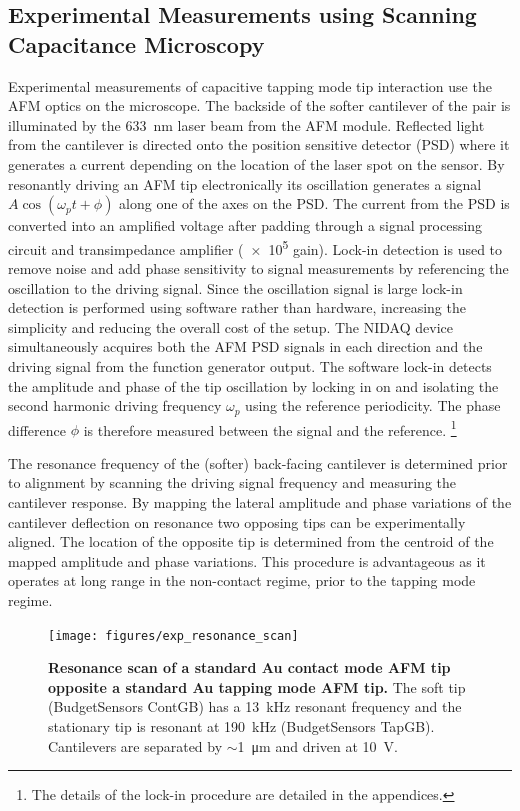 \documentclass{article}
\begin{document}
\FloatBarrier
\subsection{Experimental Measurements using Scanning Capacitance Microscopy}

Experimental measurements of capacitive tapping mode tip interaction use the AFM optics on the microscope. The backside of the softer cantilever of the pair is illuminated by the \SI{633}{nm} laser beam from the AFM module. Reflected light from the cantilever is directed onto the position sensitive detector (PSD) where it generates a current depending on the location of the laser spot on the sensor.
By resonantly driving an AFM tip electronically its oscillation generates a signal $A\cos(\omega_p t + \phi)$ along one of the axes on the PSD. The current from the PSD is converted into an amplified voltage after padding through a signal processing circuit and transimpedance amplifier (\num{e5} gain). Lock-in detection is used to remove noise and add phase sensitivity to signal measurements by referencing the oscillation to the driving signal. Since the oscillation signal is large lock-in detection is performed using software rather than hardware, increasing the simplicity and reducing the overall cost of the setup. The NIDAQ device simultaneously acquires both the AFM PSD signals in each direction and the driving signal from the function generator output. The software lock-in detects the amplitude and phase of the tip oscillation by locking in on and isolating the second harmonic driving frequency $\omega_p$ using the reference periodicity. The phase difference $\phi$ is therefore measured between the signal and the reference.%
\footnote{The details of the lock-in procedure are detailed in the appendices.}

The resonance frequency of the {\color{red}(softer) back-facing} cantilever is determined prior to alignment by scanning the driving signal frequency and measuring the cantilever response. By mapping the lateral amplitude and phase variations of the cantilever deflection on resonance two opposing tips can be experimentally aligned. The location of the opposite tip is determined from the centroid of the mapped amplitude and phase variations. This procedure is advantageous as it operates at long range in the non-contact regime, prior to the tapping mode regime.

\begin{figure}[h]
\centering
\texttt{[image: figures/exp\_resonance\_scan]}
\caption[Resonance scan of a standard Au contact mode AFM tip opposite a standard Au tapping mode AFM tip]{\textbf{Resonance scan of a standard Au contact mode AFM tip opposite a standard Au tapping mode AFM tip.} The soft tip (BudgetSensors ContGB) has a \SI{13}{kHz} resonant frequency and the stationary tip is resonant at \SI{190}{kHz} (BudgetSensors TapGB). Cantilevers are separated by $\sim$\SI{1}{\micro\metre} and driven at \SI{10}{V}.}
\label{fig:exp_freq_resp}
\end{figure}
\end{document}
